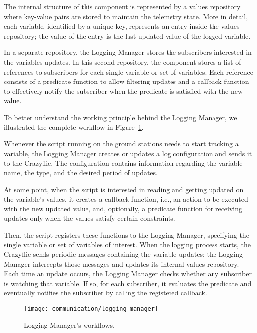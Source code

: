 The internal structure of this component is represented by a values repository where key-value pairs are stored to maintain the telemetry state.
More in detail, each variable, identified by a unique key, represents an entry inside the values repository; the value of the entry is the last updated value of the logged variable.

In a separate repository, the Logging Manager stores the subscribers interested in the variables updates. 
In this second repository, the component stores a list of references to subscribers for each single variable or set of variables. 
Each reference consists of a predicate function to allow filtering updates and a callback function to effectively notify the subscriber when the predicate is satisfied with the new value.

To better understand the working principle behind the Logging Manager, we illustrated the complete workflow in Figure~\ref{fig:logging_manager}.

Whenever the script running on the ground stations needs to start tracking a variable, the Logging Manager creates or updates a log configuration and sends it to the Crazyflie.
The configuration contains information regarding the variable name, the type, and the desired period of updates. 

At some point, when the script is interested in reading and getting updated on the variable's values, it creates a callback function, i.e., an action to be executed with the new updated value, and, optionally, a predicate function for receiving updates only when the values satisfy certain constraints.

Then, the script registers these functions to the Logging Manager, specifying the single variable or set of variables of interest.
When the logging process starts, the Crazyflie sends periodic messages containing the variable updates; the Logging Manager intercepts those messages and updates its internal values repository.
Each time an update occurs, the Logging Manager checks whether any subscriber is watching that variable. 
If so, for each subscriber, it evaluates the predicate and eventually notifies the subscriber by calling the registered callback. 

\begin{figure}[h]
    \centering
    \texttt{[image: communication/logging\_manager]}
    \caption{Logging Manager's workflows.}\label{fig:logging_manager}
\end{figure}

